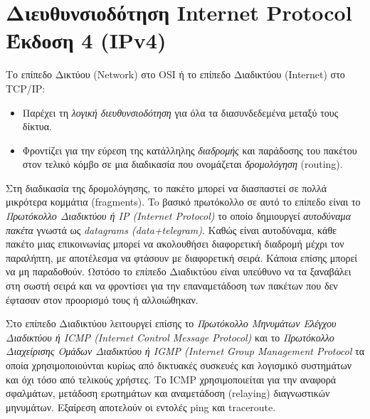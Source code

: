 %
%
\section{Διευθυνσιοδότηση Internet Protocol Έκδοση 4 (IPv4)}
Το επίπεδο Δικτύου (Network) στο OSI ή το επίπεδο Διαδικτύου (Internet) στο TCP/IP:

\begin{itemize}
\item Παρέχει τη \emph{λογική διευθυνσιοδότηση} για όλα τα διασυνδεδεμένα μεταξύ τους δίκτυα.
\item Φροντίζει για την εύρεση της κατάλληλης \emph{διαδρομής} και παράδοσης του πακέτου στον τελικό κόμβο σε μια διαδικασία που ονομάζεται \emph{δρομολόγηση} (routing).
\end{itemize}

Στη διαδικασία της δρομολόγησης, το πακέτο μπορεί να διασπαστεί σε πολλά μικρότερα κομμάτια (fragments).  To βασικό πρωτόκολλο σε αυτό το επίπεδο είναι το \emph{Πρωτόκολλο Διαδικτύου ή IP (Internet Protocol)} το οποίο δημιουργεί \emph{αυτοδύναμα πακέτα} γνωστά ως \emph{datagrams (data+telegram)}. Καθώς είναι αυτοδύναμα, κάθε πακέτο μιας επικοινωνίας μπορεί να ακολουθήσει διαφορετική διαδρομή μέχρι τον παραλήπτη, με αποτέλεσμα να φτάσουν με διαφορετική σειρά. Κάποια επίσης μπορεί να μη παραδοθούν. Ωστόσο το επίπεδο Διαδικτύου είναι υπεύθυνο να τα ξαναβάλει στη σωστή σειρά και να φροντίσει για την επαναμετάδοση των πακέτων που δεν έφτασαν στον προορισμό τους ή αλλοιώθηκαν.    

Στο επίπεδο Διαδικτύου λειτουργεί επίσης το \emph{Πρωτόκολλο Μηνυμάτων Ελέγχου Διαδικτύου ή ICMP (Internet Control Message Protocol)} και το \emph{Πρωτόκολλο Διαχείρισης Ομάδων Διαδικτύου ή IGMP (Internet Group Management Protocol} τα οποία χρησιμοποιούνται κυρίως από δικτυακές συσκευές και λογισμικό συστημάτων και όχι τόσο από τελικούς χρήστες. Το ICMP χρησιμοποιείται για την αναφορά σφαλμάτων, μετάδοση ερωτημάτων και αναμετάδοση (relaying) διαγνωστικών μηνυμάτων. Εξαίρεση αποτελούν οι εντολές ping και traceroute.

